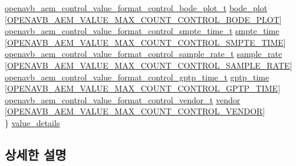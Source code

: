 \begin{DoxyCompactItemize}
\begin{tabbing}
\>\hyperlink{structopenavb__aem__control__value__format__control__bode__plot__t}{openavb\_aem\_control\_value\_format\_control\_bode\_plot\_t} \hyperlink{structopenavb__aem__descriptor__control__t_a1c0c8eff5115d465db8578e4c2ca76ea}{bode\_plot} \mbox{[}\hyperlink{openavb__aem__types__pub_8h_a0eccd4fb47c7d563a1bc1ae6e730cb83}{OPENAVB\_AEM\_VALUE\_MAX\_COUNT\_CONTROL\_BODE\_PLOT}\mbox{]}\\
\>\hyperlink{structopenavb__aem__control__value__format__control__smpte__time__t}{openavb\_aem\_control\_value\_format\_control\_smpte\_time\_t} \hyperlink{structopenavb__aem__descriptor__control__t_a9893199508fe8b0bb03b503c4900b431}{smpte\_time} \mbox{[}\hyperlink{openavb__aem__types__pub_8h_a919f5b337175b6dcbc4a2d570bfaf96d}{OPENAVB\_AEM\_VALUE\_MAX\_COUNT\_CONTROL\_SMPTE\_TIME}\mbox{]}\\
\>\hyperlink{structopenavb__aem__control__value__format__control__sample__rate__t}{openavb\_aem\_control\_value\_format\_control\_sample\_rate\_t} \hyperlink{structopenavb__aem__descriptor__control__t_a0145c61c56b361dfb5d2ec2dcc775c81}{sample\_rate} \mbox{[}\hyperlink{openavb__aem__types__pub_8h_a698fbd1bca1e356411e8501b0ca5bf3f}{OPENAVB\_AEM\_VALUE\_MAX\_COUNT\_CONTROL\_SAMPLE\_RATE}\mbox{]}\\
\>\hyperlink{structopenavb__aem__control__value__format__control__gptp__time__t}{openavb\_aem\_control\_value\_format\_control\_gptp\_time\_t} \hyperlink{structopenavb__aem__descriptor__control__t_a5fdf324efddb247667942f037b08b54c}{gptp\_time} \mbox{[}\hyperlink{openavb__aem__types__pub_8h_ab1e9c9e09f4ac56f2df79bb9fb86a156}{OPENAVB\_AEM\_VALUE\_MAX\_COUNT\_CONTROL\_GPTP\_TIME}\mbox{]}\\
\>\hyperlink{structopenavb__aem__control__value__format__control__vendor__t}{openavb\_aem\_control\_value\_format\_control\_vendor\_t} \hyperlink{structopenavb__aem__descriptor__control__t_a21bb3556d3023ec05552f72df2337d1d}{vendor} \mbox{[}\hyperlink{openavb__aem__types__pub_8h_ae9b81c8dbcb6df495f2dcde269d8d88c}{OPENAVB\_AEM\_VALUE\_MAX\_COUNT\_CONTROL\_VENDOR}\mbox{]}\\
\} \hyperlink{structopenavb__aem__descriptor__control__t_ae26bc2d928dedba799d7ec46f4682ae4}{value\_details}\\

\end{tabbing}\end{DoxyCompactItemize}


\subsection{상세한 설명}


